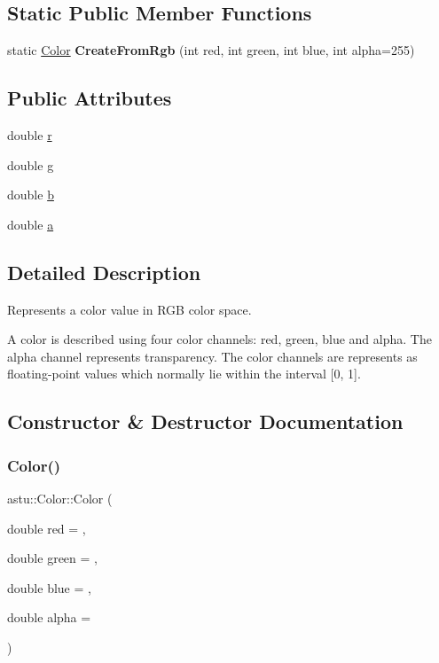 \subsection*{Static Public Member Functions}
\begin{DoxyCompactItemize}
\item 
\mbox{\label{classastu_1_1Color_a4cec5d96b38d05757c0ead266e591397}} 
static \hyperlink{classastu_1_1Color}{Color} {\bfseries Create\+From\+Rgb} (int red, int green, int blue, int alpha=255)
\end{DoxyCompactItemize}
\subsection*{Public Attributes}
\begin{DoxyCompactItemize}
\item 
double \hyperlink{classastu_1_1Color_ae1714e0caca40451f75a6b31648c6fee}{r}
\item 
double \hyperlink{classastu_1_1Color_a513c1a3bd9b8c4268efafba56bda0823}{g}
\item 
double \hyperlink{classastu_1_1Color_a3eaf42ee466c2e128373f5ddcb12d34c}{b}
\item 
double \hyperlink{classastu_1_1Color_a001a2dcf8f1f0d4abb97f8c158bfddec}{a}
\end{DoxyCompactItemize}


\subsection{Detailed Description}
Represents a color value in R\+GB color space.

A color is described using four color channels\+: red, green, blue and alpha. The alpha channel represents transparency. The color channels are represents as floating-\/point values which normally lie within the interval \mbox{[}0, 1\mbox{]}. 

\subsection{Constructor \& Destructor Documentation}
\mbox{\label{classastu_1_1Color_a3b4505ef24790685a5e22bde22ff5b05}} 
\subsubsection{\texorpdfstring{Color()}{Color()}\hspace{0.1cm}{\footnotesize\ttfamily [1/2]}}
{\footnotesize\ttfamily astu\+::\+Color\+::\+Color (\begin{DoxyParamCaption}\item[{double}]{red = {},  }\item[{double}]{green = {},  }\item[{double}]{blue = {},  }\item[{double}]{alpha = {} }\end{DoxyParamCaption})}


